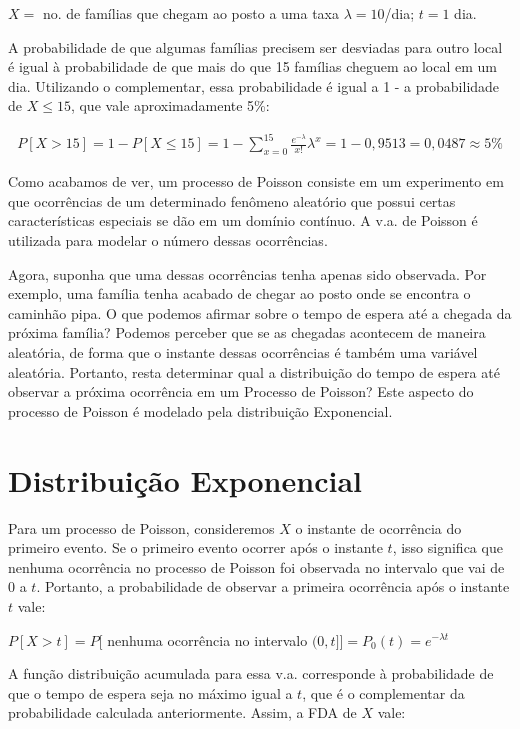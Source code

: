\documentclass[
]{book}
\theoremstyle{definition}
\theoremstyle{definition}
\theoremstyle{definition}
\theoremstyle{remark}
\begin{document}
\(X =\) no. de famílias que chegam ao posto a uma taxa \(\lambda = 10\)/dia; \(t=1\) dia.

A probabilidade de que algumas famílias precisem ser desviadas para outro local é igual à probabilidade de que mais do que 15 famílias cheguem ao local em um dia. Utilizando o complementar, essa probabilidade é igual a 1 - a probabilidade de \(X \leq 15\), que vale aproximadamente 5\%:

\begin{align*}
P[X > 15] = 1 - P[X \leq 15] = 1 - \sum_{x=0}^{15}\frac{e^{-\lambda}}{x!}\lambda^x 
          = 1 - 0,9513 = 0,0487 \approx 5\% 
\end{align*}

Como acabamos de ver, um processo de Poisson consiste em um experimento em que ocorrências de um determinado fenômeno aleatório que possui certas características especiais se dão em um domínio contínuo. A v.a. de Poisson é utilizada para modelar o número dessas ocorrências.

Agora, suponha que uma dessas ocorrências tenha apenas sido observada. Por exemplo, uma família tenha acabado de chegar ao posto onde se encontra o caminhão pipa. O que podemos afirmar sobre o tempo de espera até a chegada da próxima família? Podemos perceber que se as chegadas acontecem de maneira aleatória, de forma que o instante dessas ocorrências é também uma variável aleatória. Portanto, resta determinar qual a distribuição do tempo de espera até observar a próxima ocorrência em um Processo de Poisson? Este aspecto do processo de Poisson é modelado pela distribuição Exponencial.

\hypertarget{distribuiuxe7uxe3o-exponencial}{%
\section{Distribuição Exponencial}\label{distribuiuxe7uxe3o-exponencial}}

Para um processo de Poisson, consideremos \(X\) o instante de ocorrência do primeiro evento. Se o primeiro evento ocorrer após o instante \(t\), isso significa que nenhuma ocorrência no processo de Poisson foi observada no intervalo que vai de 0 a \(t\). Portanto, a probabilidade de observar a primeira ocorrência após o instante \(t\) vale:

\(P[X > t] = P[\) nenhuma ocorrência no intervalo \((0,t]] = P_{0}(t) = e^{-\lambda t}\)

A função distribuição acumulada para essa v.a. corresponde à probabilidade de que o tempo de espera seja no máximo igual a \(t\), que é o complementar da probabilidade calculada anteriormente. Assim, a FDA de \(X\) vale:
\end{document}
